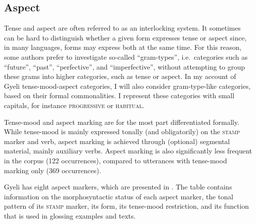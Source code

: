 \subsection*{Aspect}
Tense and aspect are often referred to as an interlocking system. It sometimes can be hard to distinguish whether a given form expresses tense or aspect since, in many languages, forms may express both at the same time. For this reason, some authors \citep{dahl85, bybee94} prefer to investigate so-called ``gram-types'', i.e.\ categories such as ``future'', ``past'', ``perfective'', and ``imperfective'', without attempting to group these grams into higher categories, such as tense or aspect.
In my account of Gyeli tense-mood-aspect categories, I will also consider gram-type-like categories, based on their formal commonalities. I represent these categories with small capitals, for instance \textsc{progressive} or \textsc{habitual}.

Tense-mood and aspect marking are for the most part differentiated formally. While tense-mood is mainly expressed tonally (and obligatorily) on the \textsc{stamp} marker and verb, aspect marking is achieved through (optional) segmental material, mainly auxiliary verbs.
Aspect marking is also significantly less frequent in the corpus (122 occurrences), compared to utterances with tense-mood marking only (369 occurrences).  


Gyeli has eight aspect markers, which are presented in .
The table contains information on the morphosyntactic status of each aspect marker,  the tonal pattern of its \textsc{stamp} marker, its form,  its tense-mood restriction, and its function that is used in glossing examples and texts.

